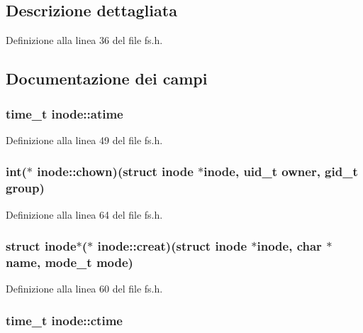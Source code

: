 \subsection{Descrizione dettagliata}


Definizione alla linea 36 del file fs.\+h.



\subsection{Documentazione dei campi}
\hypertarget{structinode_a7e52661a115f6def97778566f2be0d80}{
\subsubsection[{atime}]{\setlength{\rightskip}{0pt plus 5cm}time\+\_\+t inode\+::atime}}\label{structinode_a7e52661a115f6def97778566f2be0d80}


Definizione alla linea 49 del file fs.\+h.

\hypertarget{structinode_a8221183a697c9f2b4e0e295f5a9d8afd}{
\subsubsection[{chown}]{\setlength{\rightskip}{0pt plus 5cm}int($\ast$ inode\+::chown)(struct {\bf inode} $\ast${\bf inode}, uid\+\_\+t owner, gid\+\_\+t group)}}\label{structinode_a8221183a697c9f2b4e0e295f5a9d8afd}


Definizione alla linea 64 del file fs.\+h.

\hypertarget{structinode_ad622a049b34780786d9ba4311b06b3b4}{
\subsubsection[{creat}]{\setlength{\rightskip}{0pt plus 5cm}struct {\bf inode}$\ast$($\ast$ inode\+::creat)(struct {\bf inode} $\ast${\bf inode}, char $\ast${\bf name}, mode\+\_\+t {\bf mode})}}\label{structinode_ad622a049b34780786d9ba4311b06b3b4}


Definizione alla linea 60 del file fs.\+h.

\hypertarget{structinode_a27334a9d3c25fbac1c134ed5b9cbc566}{
\subsubsection[{ctime}]{\setlength{\rightskip}{0pt plus 5cm}time\+\_\+t inode\+::ctime}}\label{structinode_a27334a9d3c25fbac1c134ed5b9cbc566}


